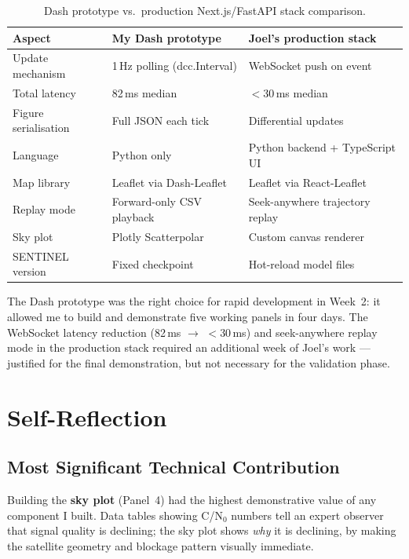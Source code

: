 \documentclass[12pt,a4paper]{article}
\begin{document}
\begin{table}[H]
  \centering
  \caption{Dash prototype vs.\ production Next.js/FastAPI stack comparison.}
  \begin{tabular}{lll}
    \toprule
    \textbf{Aspect} & \textbf{My Dash prototype} & \textbf{Joel's production stack} \\
    \midrule
    Update mechanism    & 1\,Hz polling (dcc.Interval) & WebSocket push on event \\
    Total latency       & 82\,ms median              & $<$30\,ms median \\
    Figure serialisation & Full JSON each tick         & Differential updates \\
    Language            & Python only                 & Python backend + TypeScript UI \\
    Map library         & Leaflet via Dash-Leaflet    & Leaflet via React-Leaflet \\
    Replay mode         & Forward-only CSV playback   & Seek-anywhere trajectory replay \\
    Sky plot            & Plotly Scatterpolar         & Custom canvas renderer \\
    SENTINEL version    & Fixed checkpoint            & Hot-reload model files \\
    \bottomrule
  \end{tabular}
\end{table}

The Dash prototype was the right choice for rapid development in Week~2: it allowed me
to build and demonstrate five working panels in four days.
The WebSocket latency reduction (82\,ms $\to$ $<$30\,ms) and seek-anywhere replay mode
in the production stack required an additional week of Joel's work --- justified for the
final demonstration, but not necessary for the validation phase.

\section{Self-Reflection}

\subsection{Most Significant Technical Contribution}

Building the \textbf{sky plot} (Panel~4) had the highest demonstrative value of any
component I built.
Data tables showing C/N$_0$ numbers tell an expert observer that signal quality is
declining; the sky plot shows \emph{why} it is declining, by making the satellite
geometry and blockage pattern visually immediate.
\end{document}
